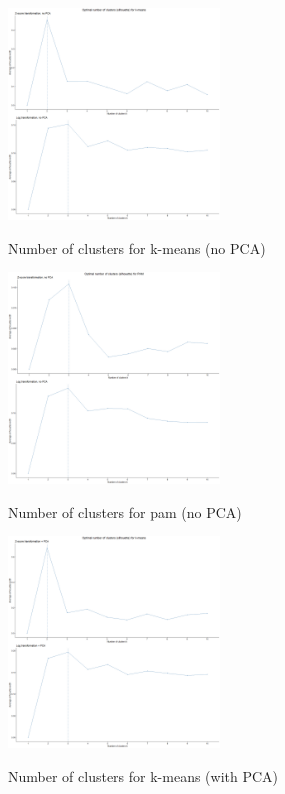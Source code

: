 \documentclass{article}
\begin{document}
	\begin{figure}[h]
		\caption{Number of clusters for k-means (no PCA)}
		\centering
		\includegraphics[width=0.5\textwidth]{"proj2_plots/kmeans_clust_num.png"}
		\label{fig::clust_num_kmeans}
	\end{figure}
	
	\begin{figure}[h]
		\caption{Number of clusters for pam (no PCA)}
		\centering
		\includegraphics[width=0.5\textwidth]{"proj2_plots/pam_clust_num.png"}
		\label{fig::clust_num_pam}
	\end{figure}
	
	\begin{figure}[h]
		\caption{Number of clusters for k-means (with PCA)}
		\centering
		\includegraphics[width=0.5\textwidth]{"proj2_plots/kmeans_clust_num_pca.png"}
		\label{fig::clust_num_keans_pca}
	\end{figure}
	
\end{document}
